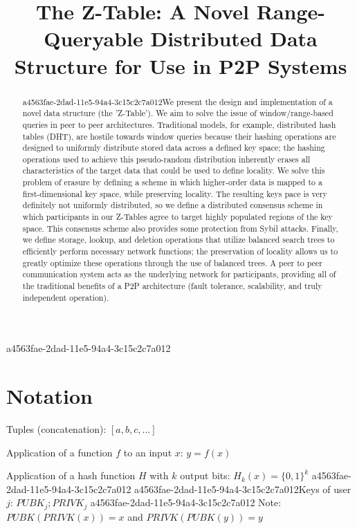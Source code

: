 \documentclass[12pt]{article}
\title{The Z-Table: A Novel Range-Queryable Distributed Data Structure for Use in P2P Systems}
\begin{document}
\maketitle
a4563fae-2dad-11e5-94a4-3c15c2c7a012
\begin{abstract}
a4563fae-2dad-11e5-94a4-3c15c2c7a012We present the design and implementation of a novel data structure (the 'Z-Table'). We aim to solve the issue of window/range-based queries in peer to peer architectures. Traditional models, for example,  distributed hash tables (DHT), are hostile towards window queries because their hashing operations are designed to uniformly distribute stored data across a defined key space; the hashing operations used to achieve this pseudo-random distribution inherently erases all characteristics of the target data that could be used to define locality. We solve this problem of erasure by defining a scheme in which higher-order data is mapped to a first-dimensional key space, while preserving locality. The resulting keys pace is very definitely not uniformly distributed, so we define a distributed consensus scheme in which participants in our Z-Tables agree to target highly populated regions of the key space. This consensus scheme also provides some protection from Sybil attacks. Finally, we define storage, lookup, and deletion operations that utilize balanced search trees to efficiently perform necessary network functions; the preservation of locality allows us to greatly optimize these operations through the use of balanced trees. A peer to peer communication system acts as the underlying network for participants, providing all of the traditional benefits of a P2P architecture (fault tolerance, scalability, and truly independent operation).
\end{abstract}

\section{Notation}

Tuples (concatenation): $[a,b,c,...]$

Application of a function $f$ to an input $x$: $y=f(x)$

Application of a hash function $H$ with $k$ output bits: $H_{k}(x) = \{0,1\}^k$
a4563fae-2dad-11e5-94a4-3c15c2c7a012
a4563fae-2dad-11e5-94a4-3c15c2c7a012Keys of user $j$: $ PUBK_j; PRIVK_j $
a4563fae-2dad-11e5-94a4-3c15c2c7a012
Note: $PUBK(PRIVK(x)) = x$ and $PRIVK(PUBK(y)) = y$~
\end{document}
